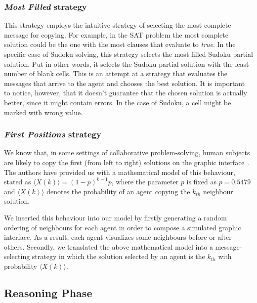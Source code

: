 \documentclass{article}
\begin{document}
\subsubsection{{\em Most Filled} strategy}

This strategy employs the intuitive strategy of selecting the most complete message for copying. For example, in the SAT problem the most complete solution could be the one with the most clauses that evaluate to \emph{true}. In the specific case of Sudoku solving, this strategy selects the most filled Sudoku partial solution. Put in other words, it selects the Sudoku partial solution with the least number of blank cells. This is an attempt at a strategy that evaluates the messages that arrive to the agent and chooses the best solution. It is important to notice, however, that it doesn't guarantee that the chosen solution is actually better, since it might contain errors. In the case of Sudoku, a cell might be marked with wrong value.

\subsubsection{{\em First Positions} strategy}

We know that, in some settings of collaborative problem-solving, human subjects are likely to copy the first (from left to right) solutions on the graphic interface~\cite{farenzena:collabem}. The authors have provided us with a mathematical model of this behaviour, stated as $\langle X(k)\rangle = (1-p)^{k-1}p$, where the parameter $p$ is fixed as $p = 0.5479$ and $\langle X(k)\rangle$ denotes the probability of an agent copying the $k_{th}$ neighbour solution.

We inserted this behaviour into our model by firstly generating a random ordering of neighbours for each agent in order to compose a simulated graphic interface. As a result, each agent visualizes some neighbours before or after others. Secondly, we translated the above mathematical model into a message-selecting strategy in which the solution selected by an agent is the $k_{th}$ with probability $\langle X(k)\rangle$.

\subsection{Reasoning Phase}
\end{document}
